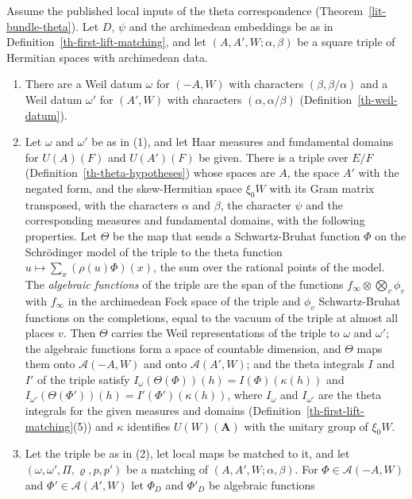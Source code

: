 \begin{lemma}\label{th-square-model}
Assume the published local inputs of the theta correspondence
(Theorem~\ref{lit-bundle-theta}). Let $D$, $\psi$ and the archimedean
embeddings be as in Definition~\ref{th-first-lift-matching}, and let
$(A,A',W;\alpha,\beta)$ be a square triple of Hermitian spaces with
archimedean data.
\begin{enumerate}
\item There are a Weil datum $\omega$ for $(-A,W)$ with characters
  $(\beta,\beta/\alpha)$ and a Weil datum $\omega'$ for $(A',W)$ with
  characters $(\alpha,\alpha/\beta)$ (Definition~\ref{th-weil-datum}).
\item Let $\omega$ and $\omega'$ be as in (1), and let Haar measures and
  fundamental domains for $U(A)(F)$ and $U(A')(F)$ be given. There is a triple
  over $E/F$ (Definition~\ref{th-theta-hypotheses}) whose spaces are $A$, the
  space $A'$ with the negated form, and the skew-Hermitian space $\xi_0W$ with
  its Gram matrix transposed, with the characters $\alpha$ and $\beta$, the
  character $\psi$ and the corresponding measures and fundamental domains,
  with the following properties. Let $\Theta$ be the map that sends a
  Schwartz-Bruhat function $\Phi$ on the Schrödinger model of the triple to
  the theta function $u\mapsto\sum_x(\rho(u)\Phi)(x)$, the sum over the
  rational points of the model. The \emph{algebraic functions} of the triple
  are the span of the functions $f_\infty\otimes\bigotimes_v\phi_v$ with
  $f_\infty$ in the archimedean Fock space of the triple and $\phi_v$
  Schwartz-Bruhat functions on the completions, equal to the vacuum of the
  triple at almost all places $v$. Then $\Theta$ carries the Weil
  representations of the triple to $\omega$ and $\omega'$; the algebraic
  functions form a space of countable dimension, and $\Theta$ maps them onto
  $\mathcal A(-A,W)$ and onto $\mathcal A(A',W)$; and the theta integrals $I$
  and $I'$ of the triple satisfy $I_\omega(\Theta(\Phi))(h)=I(\Phi)(\kappa(h))$
  and $I_{\omega'}(\Theta(\Phi'))(h)=I'(\Phi')(\kappa(h))$, where
  $I_\omega$ and $I_{\omega'}$ are the theta integrals for the given measures
  and domains (Definition~\ref{th-first-lift-matching}(5)) and $\kappa$
  identifies $U(W)(\mathbf A)$ with the unitary group of $\xi_0W$.
\item Let the triple be as in (2), let local maps be matched to it, and let
  $(\omega,\omega',\Pi,\varrho,p,p')$ be a matching of
  $(A,A',W;\alpha,\beta)$. For $\Phi\in\mathcal A(-A,W)$ and
  $\Phi'\in\mathcal A(A',W)$ let $\Phi_D$ and $\Phi'_D$ be algebraic functions

\end{enumerate}
\end{lemma}
